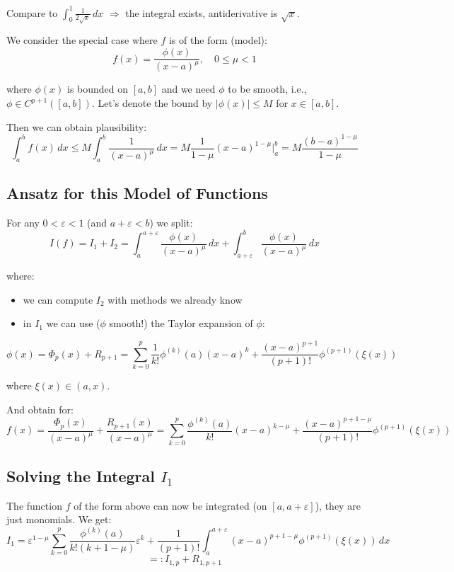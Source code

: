 Compare to $\int_0^1 \frac{1}{2\sqrt{x}} \, dx$ $\Rightarrow$ the integral exists, antiderivative is $\sqrt{x}$.

We consider the special case where $f$ is of the form (model):
\[f(x) = \frac{\phi(x)}{(x-a)^{\mu}}, \quad 0 \leq \mu < 1\]

where $\phi(x)$ is bounded on $[a,b]$ and we need $\phi$ to be smooth, i.e., $\phi \in C^{p+1}([a,b])$. Let's denote the bound by $|\phi(x)| \leq M$ for $x \in [a,b]$.

Then we can obtain plausibility:
\[\int_a^b f(x) \, dx \leq M \int_a^b \frac{1}{(x-a)^{\mu}} \, dx = M \frac{1}{1-\mu} (x-a)^{1-\mu} \Big|_a^b = M \frac{(b-a)^{1-\mu}}{1-\mu}\]

\subsection{Ansatz for this Model of Functions}

For any $0 < \varepsilon < 1$ (and $a + \varepsilon < b$) we split:
\[I(f) = I_1 + I_2 = \int_a^{a+\varepsilon} \frac{\phi(x)}{(x-a)^{\mu}} \, dx + \int_{a+\varepsilon}^b \frac{\phi(x)}{(x-a)^{\mu}} \, dx\]

where:
\begin{itemize}
    \item we can compute $I_2$ with methods we already know
    \item in $I_1$ we can use ($\phi$ smooth!) the Taylor expansion of $\phi$:
\end{itemize}

\[\phi(x) = \Phi_p(x) + R_{p+1} = \sum_{k=0}^p \frac{1}{k!} \phi^{(k)}(a)(x-a)^k + \frac{(x-a)^{p+1}}{(p+1)!} \phi^{(p+1)}(\xi(x))\]

where $\xi(x) \in (a,x)$.

And obtain for:
\[f(x) = \frac{\Phi_p(x)}{(x-a)^{\mu}} + \frac{R_{p+1}(x)}{(x-a)^{\mu}} = \sum_{k=0}^p \frac{\phi^{(k)}(a)}{k!} (x-a)^{k-\mu} + \frac{(x-a)^{p+1-\mu}}{(p+1)!} \phi^{(p+1)}(\xi(x))\]

\subsection{Solving the Integral \texorpdfstring{$I_1$}{I1}}

The function $f$ of the form above can now be integrated (on $[a, a+\varepsilon]$), they are just monomials. We get:
\[I_1 = \varepsilon^{1-\mu} \sum_{k=0}^p \frac{\phi^{(k)}(a)}{k!(k+1-\mu)} \varepsilon^k + \frac{1}{(p+1)!} \int_a^{a+\varepsilon} (x-a)^{p+1-\mu} \phi^{(p+1)}(\xi(x)) \, dx\]
\[=: I_{1,p} + R_{1,p+1}\]

